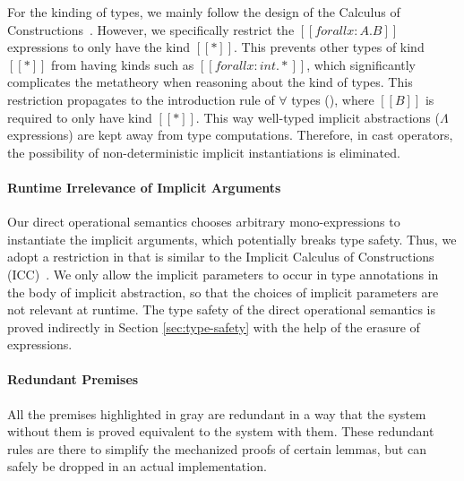 For the kinding of types, we mainly follow the design of the Calculus of
Constructions~\cite{CoquandThierry1988Tcoc}. However, we specifically restrict
the $[[forall x : A. B]]$
expressions to only have the kind $[[*]]$. This prevents other types of kind
$[[*]]$ from having kinds such as $[[forall x : int. *]]$,
which significantly complicates the metatheory when reasoning about the kind of types.
This restriction propagates to the introduction rule of $\forall$ types (),
where $[[B]]$ is required to only have kind $[[*]]$.
This way well-typed implicit abstractions ($\Lambda$ expressions) are kept away
from type computations. Therefore, in cast operators,
the possibility of non-deterministic implicit instantiations is eliminated.

\paragraph{Runtime Irrelevance of Implicit Arguments}

Our direct operational semantics chooses arbitrary mono-expressions to instantiate
the implicit arguments, which potentially breaks type safety. Thus, we adopt a
restriction in  that is similar to the
Implicit Calculus of Constructions (ICC)~\cite{miquel2001implicit}.
We only allow the implicit parameters to occur in type annotations in the
body of implicit abstraction, so that the choices of implicit parameters are not
relevant at runtime. The type safety of the direct operational semantics is
proved indirectly in Section \ref{sec:type-safety} with the help of the
erasure of expressions.

\paragraph{Redundant Premises}

All the premises highlighted in gray are redundant in a way that
the system without them is proved equivalent to the system with them.
These redundant rules are there to simplify the mechanized proofs of
certain lemmas, but can safely be dropped in an actual implementation.

